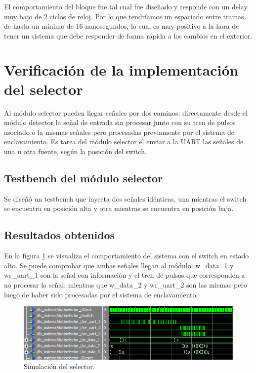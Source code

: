 	El comportamiento del bloque fue tal cual fue diseñado y responde con un delay muy bajo de 2 ciclos de reloj. Por lo que tendríamos un espaciado entre tramas de hasta un mínimo de 16 nanosegundos, lo cual es muy positivo a la hora de tener un sistema que debe responder de forma rápida a los cambios en el exterior.	
	
\section{Verificación de la implementación del selector}

	Al módulo selector pueden llegar señales por dos caminos: directamente desde el módulo detector la señal de entrada sin procesar junto con su tren de pulsos asociado o la mismas señales pero procesadas previamente por el sistema de enclavamiento. Es tarea del módulo selector el enviar a la UART las señales de una u otra fuente, según la posición del switch.	
	
	\subsection{Testbench del módulo selector}
			
		Se diseñó un testbench que inyecta dos señales idénticas, una mientras el switch se encuentra en posición alta y otra mientras se encuentra en posición baja.		
						
	\subsection{Resultados obtenidos}
				
		En la figura \ref{fig:Test_Selector} se visualiza el comportamiento del sistema con el switch en estado alto. Se puede comprobar que ambas señales llegan al módulo: w\_data\_1 y wr\_uart\_1 son la señal con información y el tren de pulsos que corresponden a no procesar la señal; mientras que w\_data\_2 y wr\_uart\_2 son las mismas pero luego de haber sido procesadas por el sistema de enclavamiento.
			
	\begin{figure}[h]
	\centering
	\includegraphics[scale=0.9]{./Figures/Test/Selector}
		\caption{Simulación del selector.}
		\label{fig:Test_Selector}
	\end{figure}
	

